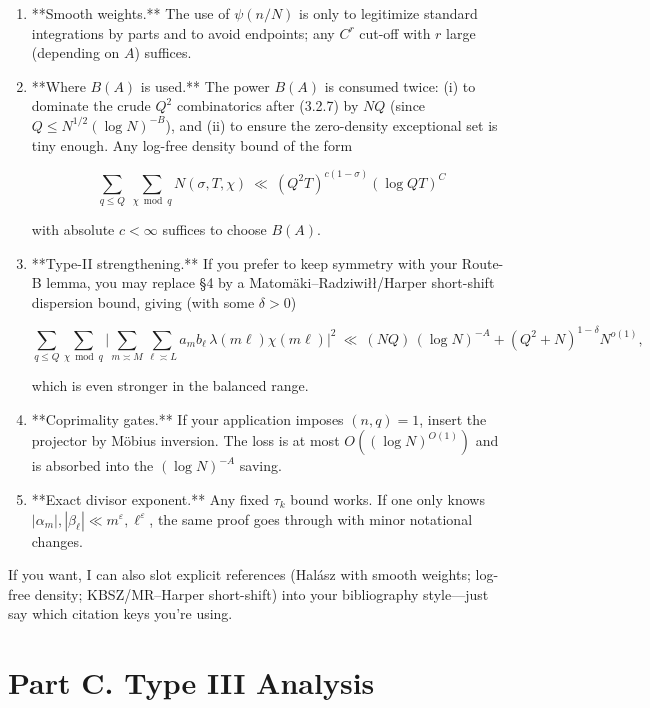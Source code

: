 \documentclass[11pt]{article}
\theoremstyle{definition}
\theoremstyle{remark}
\begin{document}
\begin{enumerate}
\item **Smooth weights.** The use of $\psi(n/N)$ is only to legitimize standard integrations by parts and to avoid endpoints; any $C^r$ cut-off with $r$ large (depending on $A$) suffices.

\item **Where $B(A)$ is used.** The power $B(A)$ is consumed twice: (i) to dominate the crude $Q^2$ combinatorics after (3.2.7) by $NQ$ (since $Q\le N^{1/2}(\log N)^{-B}$), and (ii) to ensure the zero-density exceptional set is tiny enough. Any log-free density bound of the form

$$
\sum_{q\le Q}\ \sum_{\chi\bmod q}\! N(\sigma,T,\chi)\ \ll\ (Q^2T)^{c(1-\sigma)}(\log QT)^{C}
$$

with absolute $c<\infty$ suffices to choose $B(A)$.

\item **Type-II strengthening.** If you prefer to keep symmetry with your Route-B lemma, you may replace §4 by a Matomäki–Radziwiłł/Harper short-shift dispersion bound, giving (with some $\delta>0$)

$$
\sum_{q\le Q}\sum_{\chi\bmod q}\Big|\sum_{m\asymp M}\sum_{\ell\asymp L} a_m b_\ell\,\lambda(m\ell)\chi(m\ell)\Big|^2
\ \ll\ (NQ)\,(\log N)^{-A}+ (Q^2+N)^{1-\delta}N^{o(1)},
$$

which is even stronger in the balanced range.

\item **Coprimality gates.** If your application imposes $(n,q)=1$, insert the projector by Möbius inversion. The loss is at most $O((\log N)^{O(1)})$ and is absorbed into the $(\log N)^{-A}$ saving.

\item **Exact divisor exponent.** Any fixed $\tau_k$ bound works. If one only knows $|\alpha_m|,|\beta_\ell|\ll m^\varepsilon,\ell^\varepsilon$, the same proof goes through with minor notational changes.
\end{enumerate}


If you want, I can also slot explicit references (Halász with smooth weights; log-free density; KBSZ/MR–Harper short-shift) into your bibliography style—just say which citation keys you’re using.


\part*{Part C. Type III Analysis}
\end{document}
